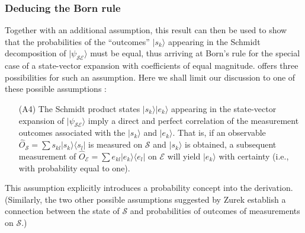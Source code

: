 \documentclass[twocolumn,rmp,aps,amsmath,amsfonts,noshowkeys,noshowpacs]{revtex4}
\newcommand{\ket}[1]{\ensuremath{|{#1\rangle}}}
\newcommand{\ketbra}[2]{\ensuremath{|{#1 \rangle}{\langle #2}|}}
\begin{document}
\subsubsection{Deducing the Born rule}

Together with an additional assumption, this result can then be used
to show that the probabilities of the ``outcomes'' $\ket{s_k}$
appearing in the Schmidt decomposition of $\ket{\psi_\mathcal{SE}}$
must be equal, thus arriving at Born's rule for the special case of a
state-vector expansion with coefficients of equal magnitude.
\citet{Zurek:2004:yb} offers three possibilities for such an
assumption. Here we shall limit our discussion to one of these
possible assumptions \citep[see also the comments in][]{Schlosshauer:2003:ms}:

\begin{enumerate} 

\item[(A4)] The Schmidt product states $\ket{s_k}\ket{e_k}$ appearing
  in the state-vector expansion of $\ket{\psi_\mathcal{SE}}$ imply a
  direct and perfect correlation of the measurement outcomes
  associated with the $\ket{s_k}$ and $\ket{e_k}$.  That is, if an
  observable $\widehat{O}_\mathcal{S} = \sum s_{kl} \ketbra{s_k}{s_l}$
  is measured on $\mathcal{S}$ and $\ket{s_k}$ is obtained, a
  subsequent measurement of $\widehat{O}_\mathcal{E} = \sum e_{kl}
  \ketbra{e_k}{e_l}$ on $\mathcal{E}$ will yield $\ket{e_k}$ with
  certainty (i.e., with probability equal to one).

\end{enumerate}

This assumption explicitly introduces a probability concept into the
derivation. (Similarly, the two other possible assumptions suggested
by Zurek establish a connection between the state of $\mathcal{S}$ and
probabilities of outcomes of measurements on $\mathcal{S}$.)
\end{document}
